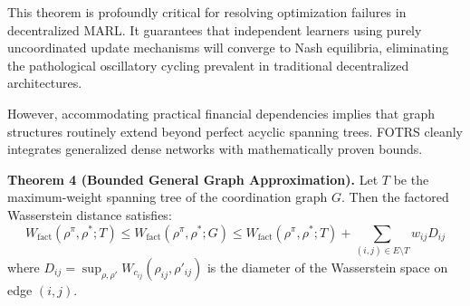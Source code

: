 \documentclass[12pt,a4paper,oneside]{report}
\theoremstyle{definition}
\theoremstyle{remark}
\begin{document}
\medskip
This theorem is profoundly critical for resolving optimization failures in decentralized MARL. It guarantees that independent learners using purely uncoordinated update mechanisms will converge to Nash equilibria, eliminating the pathological oscillatory cycling prevalent in traditional decentralized architectures.

However, accommodating practical financial dependencies implies that graph structures routinely extend beyond perfect acyclic spanning trees. FOTRS cleanly integrates generalized dense networks with mathematically proven bounds.

\medskip
\textbf{Theorem 4 (Bounded General Graph Approximation).} Let $T$ be the maximum-weight spanning tree of the coordination graph $G$. Then the factored Wasserstein distance satisfies:
\begin{equation} \label{eq:tree_bound}
W_{\text{fact}}(\rho^\pi, \rho^*; T) \leq W_{\text{fact}}(\rho^\pi, \rho^*; G) \leq W_{\text{fact}}(\rho^\pi, \rho^*; T) + \sum_{(i,j) \in E \setminus T} w_{ij} D_{ij}
\end{equation}
where $D_{ij} = \sup_{\rho, \rho'} W_{c_{ij}}(\rho_{ij}, \rho'_{ij})$ is the diameter of the Wasserstein space on edge $(i,j)$.
\end{document}
